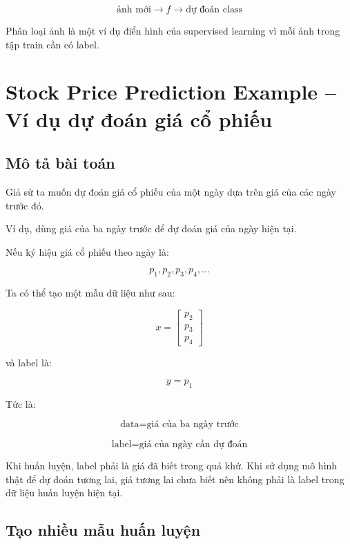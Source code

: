 \[
    \text{ảnh mới}
    \rightarrow
    f
    \rightarrow
    \text{dự đoán class}
\]

\begin{ghinho}
Phân loại ảnh là một ví dụ điển hình của supervised learning vì mỗi ảnh trong tập train cần có label.
\end{ghinho}

\section{Stock Price Prediction Example -- Ví dụ dự đoán giá cổ phiếu}

\subsection{Mô tả bài toán}

Giả sử ta muốn dự đoán giá cổ phiếu của một ngày dựa trên giá của các ngày trước đó.

Ví dụ, dùng giá của ba ngày trước để dự đoán giá của ngày hiện tại.

Nếu ký hiệu giá cổ phiếu theo ngày là:

\[
    p_1,p_2,p_3,p_4,\ldots
\]

Ta có thể tạo một mẫu dữ liệu như sau:

\[
    x =
    \begin{bmatrix}
    p_2\\
    p_3\\
    p_4
    \end{bmatrix}
\]

và label là:

\[
    y=p_1
\]

Tức là:

\[
    \text{data} = \text{giá của ba ngày trước}
\]

\[
    \text{label} = \text{giá của ngày cần dự đoán}
\]

\begin{luuy}
Khi huấn luyện, label phải là giá đã biết trong quá khứ. Khi sử dụng mô hình thật để dự đoán tương lai, giá tương lai chưa biết nên không phải là label trong dữ liệu huấn luyện hiện tại.
\end{luuy}

\subsection{Tạo nhiều mẫu huấn luyện}

